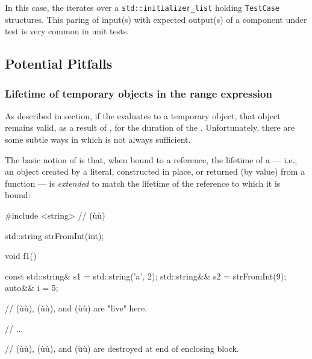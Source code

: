 {{\noindent In this case, the  iterates over a
\lstinline!std::initializer_list! holding \lstinline!TestCase! structures.
This paring of input(s) with expected output(s) of a component under
test is very common in unit tests.

\subsection[Potential Pitfalls]{Potential Pitfalls}\label{potential-pitfalls}

\subsubsection[Lifetime of temporary objects in the range expression]{Lifetime of temporary objects in the range expression}\label{lifetime-of-temporary-objects-in-the-range-expression}

As described in  section, if the  evaluates to a temporary object, that object remains valid,
as a result of , for the duration of the
. Unfortunately, there are some
subtle ways in which  is not always
sufficient.

The basic notion of  is that, when bound to a
reference, the lifetime of a  --- i.e., an object
created by a literal, constructed in place, or returned (by value) from
a function --- is \emph{extended} to match the lifetime of the reference
to which it is bound:

\begin{emcppslisting}[emcppsbatch=e3]
#include <string>  // (ù{}ù)

std::string strFromInt(int);

void f1()
{
    const std::string& s1 = std::string('a', 2);
    std::string&&      s2 = strFromInt(9);
    auto&&             i  = 5;

    // (ù{}ù), (ù{}ù), and (ù{}ù) are "live" here.

    // ...

}  // (ù{}ù), (ù{}ù), and (ù{}ù) are destroyed at end of enclosing block.
\end{emcppslisting}
    

}}
